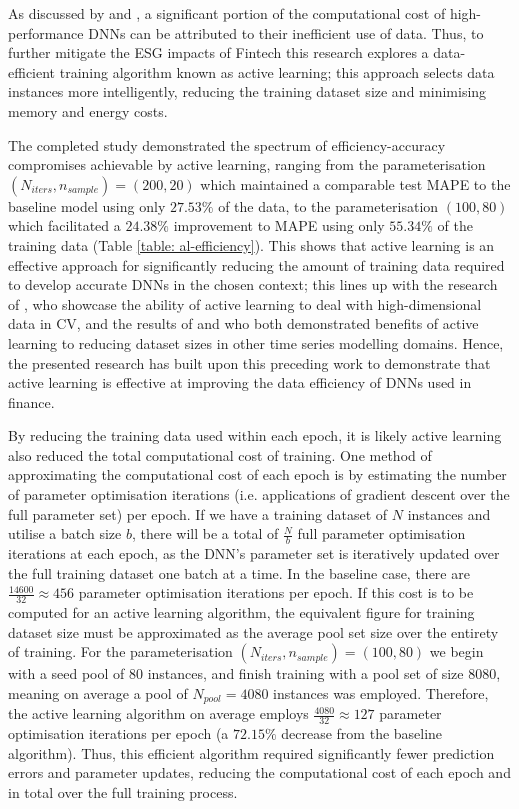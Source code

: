 \documentclass[a4paper, 11pt]{report}
\begin{document}
    As discussed by \citet{bender-2021} and \citet{walsh-2021}, a significant portion of the computational cost of high-performance DNNs can be attributed to their inefficient use of data. Thus, to further mitigate the ESG impacts of Fintech this research explores a data-efficient training algorithm known as active learning; this approach selects data instances more intelligently, reducing the training dataset size and minimising memory and energy costs.

    The completed study demonstrated the spectrum of efficiency-accuracy compromises achievable by active learning, ranging from the parameterisation $(N_{iters}, n_{sample}) = (200, 20)$ which maintained a comparable test MAPE to the baseline model using only $27.53\%$ of the data, to the parameterisation $(100, 80)$ which facilitated a $24.38\%$ improvement to MAPE using only $55.34\%$ of the training data (Table \ref{table: al-efficiency}). This shows that active learning is an effective approach for significantly reducing the amount of training data required to develop accurate DNNs in the chosen context; this lines up with the research of \citet{ren-2021}, who showcase the ability of active learning to deal with high-dimensional data in CV, and the results of \citet{peng-2017} and \citet{zimmer-2018} who both demonstrated benefits of active learning to reducing dataset sizes in other time series modelling domains. Hence, the presented research has built upon this preceding work to demonstrate that active learning is effective at improving the data efficiency of DNNs used in finance.

    By reducing the training data used within each epoch, it is likely active learning also reduced the total computational cost of training. One method of approximating the computational cost of each epoch is by estimating the number of parameter optimisation iterations (i.e. applications of gradient descent over the full parameter set) per epoch. If we have a training dataset of $N$ instances and utilise a batch size $b$, there will be a total of $\frac{N}{b}$ full parameter optimisation iterations at each epoch, as the DNN's parameter set is iteratively updated over the full training dataset one batch at a time. In the baseline case, there are $\frac{14600}{32} \approx 456$ parameter optimisation iterations per epoch. If this cost is to be computed for an active learning algorithm, the equivalent figure for training dataset size must be approximated as the average pool set size over the entirety of training. For the parameterisation $(N_{iters}, n_{sample}) = (100, 80)$ we begin with a seed pool of $80$ instances, and finish training with a pool set of size $8080$, meaning on average a pool of $N_{pool} = 4080$ instances was employed. Therefore, the active learning algorithm on average employs $\frac{4080}{32} \approx 127$ parameter optimisation iterations per epoch (a $72.15\%$ decrease from the baseline algorithm). Thus, this efficient algorithm required significantly fewer prediction errors and parameter updates, reducing the computational cost of each epoch and in total over the full training process.
\end{document}
